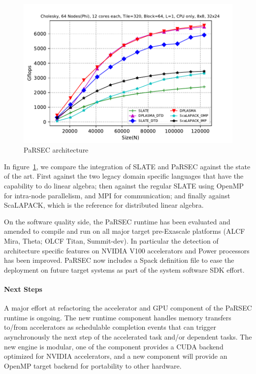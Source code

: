 \begin{figure}
  \centering\includegraphics[scale=0.5]{projects/2.3.1-PMR/2.3.1.09-ParSEC/SLATE_inital_result_phicluster_scalapack.pdf}
  \caption{PaRSEC architecture \label{fig:slate-parsec}}
\end{figure}
%
In figure~\ref{fig:slate-parsec}, we compare the integration of SLATE
and PaRSEC against the state of the art. First against the two legacy
domain specific languages that have the capability to do linear
algebra; then against the regular SLATE using OpenMP for intra-node
parallelism, and MPI for communication; and finally against ScaLAPACK,
which is the reference for distributed linear algebra.

On the software quality side, the PaRSEC runtime has been evaluated and amended
to compile and run on all major target pre-Exascale platforms (ALCF Mira, Theta; OLCF
Titan, Summit-dev). In particular the detection of architecture specific
features on NVIDIA V100 accelerators and Power processors has been improved.
PaRSEC now includes a Spack definition file to ease the deployment on future
target systems as part of the system software SDK effort.

\paragraph{Next Steps}

A major effort at refactoring the accelerator and GPU component
of the PaRSEC runtime is ongoing. The new runtime component handles
memory transfers to/from accelerators as schedulable completion events
that can trigger asynchronously the next step of the accelerated task
and/or dependent tasks. The new engine is modular, one of the component
provides a CUDA backend optimized for NVIDIA accelerators, and a new component
will provide an OpenMP target backend for portability to other hardware.


